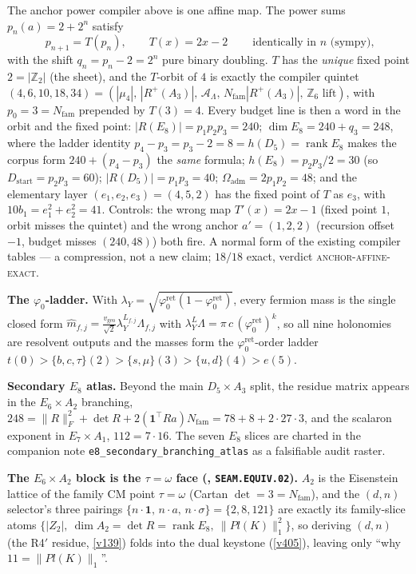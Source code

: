 \documentclass[11pt,a4paper]{article}
\newcommand{\Nfam}{N_{\mathrm{fam}}}
\newcommand{\Oadm}{\Omega_{\mathrm{adm}}}
\newcommand{\phiz}{\varphi_0^{\mathrm{ret}}}
\newcommand{\AL}{\mathcal A_\Lambda}
\newcommand{\Z}{\mathbb{Z}}
\theoremstyle{definition}
\begin{document}
\begin{keybox}
The anchor power compiler above is one affine map.  The power sums $p_n(a)=2+2^n$ satisfy
\[
  \boxed{\ p_{n+1}=T(p_n),\qquad T(x)=2x-2\ }\qquad\text{identically in $n$ (sympy),}
\]
with the shift $q_n=p_n-2=2^n$ pure binary doubling.  $T$ has the \emph{unique} fixed point
$2=|\Z_2|$ (the sheet), and the $T$-orbit of $4$ is exactly the compiler quintet
$(4,6,10,18,34)=(|\mu_4|,\,|R^+(A_3)|,\,\AL,\,\Nfam|R^+(A_3)|,\,\text{$\Z_6$ lift})$, with
$p_0=3=\Nfam$ prepended by $T(3)=4$.  Every budget line is then a word in the orbit and the fixed
point: $|R(E_8)|=p_1p_2p_3=240$; $\dim E_8=240+q_3=248$, where the ladder identity
$p_4-p_3=p_3-2=8=h(D_5)=\operatorname{rank}E_8$ makes the corpus form $240+(p_4{-}p_3)$ the
\emph{same} formula; $h(E_8)=p_2p_3/2=30$ (so $D_{\mathrm{start}}=p_2p_3=60$); $|R(D_5)|=p_1p_3=40$;
$\Oadm=2p_1p_2=48$; and the elementary layer $(e_1,e_2,e_3)=(4,5,2)$ has the fixed point of $T$ as
$e_3$, with $10b_1=e_1^2+e_2^2=41$.  Controls: the wrong map $T'(x)=2x-1$ (fixed point $1$, orbit
misses the quintet) and the wrong anchor $a'=(1,2,2)$ (recursion offset $-1$, budget misses
$(240,48)$) both fire.  A normal form of the existing compiler tables --- a compression, not a new
claim; $18/18$ exact, verdict \textsc{anchor-affine-exact}.
\end{keybox}

\noindent\textbf{The $\varphi_0$-ladder.} With $\lambda_Y=\sqrt{\phiz(1-\phiz)}$, every fermion mass is the
single closed form $\hat m_{f,j}=\tfrac{v_{\mathrm{geo}}}{\sqrt2}\lambda_Y^{L_{f,j}}\Lambda_{f,j}$ with
$\lambda_Y^{L}\Lambda=\pi\,c\,(\phiz)^{k}$, so all nine holonomies are resolvent outputs and the masses
form the $\phiz$-order ladder $t(0)>\{b,c,\tau\}(2)>\{s,\mu\}(3)>\{u,d\}(4)>e(5)$.

\noindent\textbf{Secondary $E_8$ atlas.} Beyond the main $D_5\times A_3$ split, the residue matrix appears
in the $E_6\times A_2$ branching, $248=\|R\|_F^2+\det R+2(\mathbf 1^\top Ra)\Nfam=78+8+2\cdot27\cdot3$, and
the scalaron exponent in $E_7\times A_1$, $112=7\cdot16$. The seven $E_8$ slices are charted in the
companion note \texttt{e8\_secondary\_branching\_atlas} as a falsifiable audit raster.
\par\smallskip\noindent\textbf{The $E_6{\times}A_2$ block is the $\tau{=}\omega$ face
(, \texttt{SEAM.EQUIV.02}).} $A_2$ is the Eisenstein lattice of the family
CM point $\tau{=}\omega$ (Cartan $\det=3=\Nfam$), and the $(d,n)$ selector's three pairings
$\{n{\cdot}\mathbf1,\,n{\cdot}a,\,n{\cdot}\sigma\}=\{2,8,121\}$ are exactly its family-slice atoms
$\{|Z_2|,\ \dim A_2{=}\det R{=}\operatorname{rank}E_8,\ \|Pl(K)\|_1^2\}$, so deriving $(d,n)$ (the R4$'$
residue, \vref{v139}) folds into the dual keystone (\vref{v405}), leaving only ``why $11{=}\|Pl(K)\|_1$''.
\end{document}
